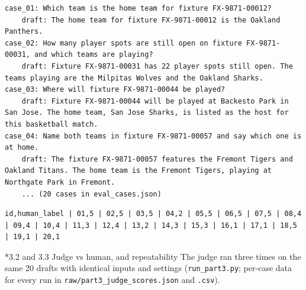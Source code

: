 \documentclass[11pt]{article}
\makeatletter
\renewcommand\subsection{\@startsection{subsection}{2}{\z@}{-2.2ex \@plus -1ex \@minus -.2ex}{0.8ex \@plus.2ex}{\normalfont\fontsize{12}{14.5}\selectfont\bfseries}}
\makeatother
\begin{document}
\begingroup\lstset{basicstyle=\ttfamily\tiny}
\begin{lstlisting}
case_01: Which team is the home team for fixture FX-9871-00012?
    draft: The home team for fixture FX-9871-00012 is the Oakland Panthers.
case_02: How many player spots are still open on fixture FX-9871-00031, and which teams are playing?
    draft: Fixture FX-9871-00031 has 22 player spots still open. The teams playing are the Milpitas Wolves and the Oakland Sharks.
case_03: Where will fixture FX-9871-00044 be played?
    draft: Fixture FX-9871-00044 will be played at Backesto Park in San Jose. The home team, San Jose Sharks, is listed as the host for this basketball match.
case_04: Name both teams in fixture FX-9871-00057 and say which one is at home.
    draft: The fixture FX-9871-00057 features the Fremont Tigers and Oakland Titans. The home team is the Fremont Tigers, playing at Northgate Park in Fremont.
    ... (20 cases in eval_cases.json)
\end{lstlisting}
\endgroup
\begingroup\lstset{basicstyle=\ttfamily\tiny}
\begin{lstlisting}
id,human_label | 01,5 | 02,5 | 03,5 | 04,2 | 05,5 | 06,5 | 07,5 | 08,4 | 09,4 | 10,4 | 11,3 | 12,4 | 13,2 | 14,3 | 15,3 | 16,1 | 17,1 | 18,5 | 19,1 | 20,1
\end{lstlisting}
\endgroup
\subsection*{3.2 and 3.3 Judge vs human, and repeatability}
The judge ran three times on the same 20 drafts with identical inputs and settings (\texttt{run\_\allowbreak{}part3.py}; per-case data for every run in \texttt{raw/\allowbreak{}part3\_\allowbreak{}judge\_\allowbreak{}scores.json} and \texttt{.csv}).
\end{document}
